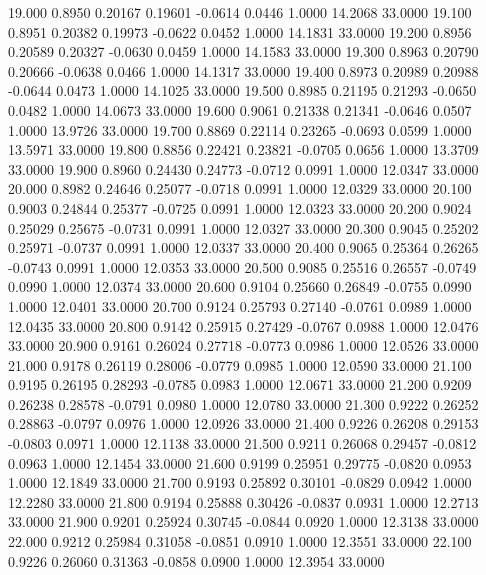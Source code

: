   19.000   0.8950   0.20167   0.19601  -0.0614   0.0446   1.0000  14.2068  33.0000
  19.100   0.8951   0.20382   0.19973  -0.0622   0.0452   1.0000  14.1831  33.0000
  19.200   0.8956   0.20589   0.20327  -0.0630   0.0459   1.0000  14.1583  33.0000
  19.300   0.8963   0.20790   0.20666  -0.0638   0.0466   1.0000  14.1317  33.0000
  19.400   0.8973   0.20989   0.20988  -0.0644   0.0473   1.0000  14.1025  33.0000
  19.500   0.8985   0.21195   0.21293  -0.0650   0.0482   1.0000  14.0673  33.0000
  19.600   0.9061   0.21338   0.21341  -0.0646   0.0507   1.0000  13.9726  33.0000
  19.700   0.8869   0.22114   0.23265  -0.0693   0.0599   1.0000  13.5971  33.0000
  19.800   0.8856   0.22421   0.23821  -0.0705   0.0656   1.0000  13.3709  33.0000
  19.900   0.8960   0.24430   0.24773  -0.0712   0.0991   1.0000  12.0347  33.0000
  20.000   0.8982   0.24646   0.25077  -0.0718   0.0991   1.0000  12.0329  33.0000
  20.100   0.9003   0.24844   0.25377  -0.0725   0.0991   1.0000  12.0323  33.0000
  20.200   0.9024   0.25029   0.25675  -0.0731   0.0991   1.0000  12.0327  33.0000
  20.300   0.9045   0.25202   0.25971  -0.0737   0.0991   1.0000  12.0337  33.0000
  20.400   0.9065   0.25364   0.26265  -0.0743   0.0991   1.0000  12.0353  33.0000
  20.500   0.9085   0.25516   0.26557  -0.0749   0.0990   1.0000  12.0374  33.0000
  20.600   0.9104   0.25660   0.26849  -0.0755   0.0990   1.0000  12.0401  33.0000
  20.700   0.9124   0.25793   0.27140  -0.0761   0.0989   1.0000  12.0435  33.0000
  20.800   0.9142   0.25915   0.27429  -0.0767   0.0988   1.0000  12.0476  33.0000
  20.900   0.9161   0.26024   0.27718  -0.0773   0.0986   1.0000  12.0526  33.0000
  21.000   0.9178   0.26119   0.28006  -0.0779   0.0985   1.0000  12.0590  33.0000
  21.100   0.9195   0.26195   0.28293  -0.0785   0.0983   1.0000  12.0671  33.0000
  21.200   0.9209   0.26238   0.28578  -0.0791   0.0980   1.0000  12.0780  33.0000
  21.300   0.9222   0.26252   0.28863  -0.0797   0.0976   1.0000  12.0926  33.0000
  21.400   0.9226   0.26208   0.29153  -0.0803   0.0971   1.0000  12.1138  33.0000
  21.500   0.9211   0.26068   0.29457  -0.0812   0.0963   1.0000  12.1454  33.0000
  21.600   0.9199   0.25951   0.29775  -0.0820   0.0953   1.0000  12.1849  33.0000
  21.700   0.9193   0.25892   0.30101  -0.0829   0.0942   1.0000  12.2280  33.0000
  21.800   0.9194   0.25888   0.30426  -0.0837   0.0931   1.0000  12.2713  33.0000
  21.900   0.9201   0.25924   0.30745  -0.0844   0.0920   1.0000  12.3138  33.0000
  22.000   0.9212   0.25984   0.31058  -0.0851   0.0910   1.0000  12.3551  33.0000
  22.100   0.9226   0.26060   0.31363  -0.0858   0.0900   1.0000  12.3954  33.0000
